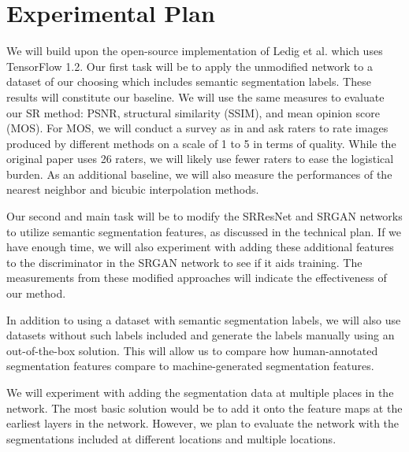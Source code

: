 \documentclass[10pt,twocolumn,letterpaper]{article}
\begin{document}
\section{Experimental Plan}
We will build upon the open-source implementation of Ledig et al. \cite{SRGAN}
which uses TensorFlow 1.2. Our first task will be to apply the unmodified
network to a dataset of our choosing which includes semantic segmentation
labels. These results will constitute our baseline. We will use the same
measures to evaluate our SR method: PSNR, structural similarity (SSIM), and
mean opinion score (MOS). For MOS, we will conduct a survey as in \cite{SRGAN}
and ask raters to rate images produced by different methods on a scale of 1 to
5 in terms of quality. While the original paper uses 26 raters, we will likely
use fewer raters to ease the logistical burden. As an additional baseline, we
will also measure the performances of the nearest neighbor and bicubic
interpolation methods.

Our second and main task will be to modify the SRResNet and SRGAN networks to
utilize semantic segmentation features, as discussed in the technical plan. If
we have enough time, we will also experiment with adding these additional
features to the discriminator in the SRGAN network to see if it aids training.
The measurements from these modified approaches will indicate the effectiveness
of our method.

In addition to using a dataset with semantic segmentation labels, we will also
use datasets without such labels included and generate the labels manually
using an out-of-the-box solution. This will allow us to compare how
human-annotated segmentation features compare to machine-generated segmentation
features.

We will experiment with adding the segmentation data at multiple places in the
network. The most basic solution would be to add it onto the feature maps at
the earliest layers in the network. However, we plan to evaluate the network
with the segmentations included at different locations and multiple locations.

\end{document}

